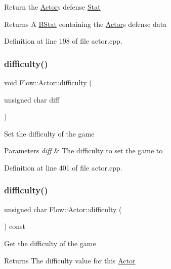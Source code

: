 Return the \hyperlink{class_flow_1_1_actor}{Actor}\textquotesingle{}s defense \hyperlink{class_flow_1_1_stat}{Stat} \begin{DoxyReturn}{Returns}
A \hyperlink{class_flow_1_1_b_stat}{B\+Stat} containing the \hyperlink{class_flow_1_1_actor}{Actor}\textquotesingle{}s defense data 
\end{DoxyReturn}


Definition at line 198 of file actor.\+cpp.

\hypertarget{class_flow_1_1_actor_aec7a9e3499e6d4441d3f32c4437b3d83}{}\label{class_flow_1_1_actor_aec7a9e3499e6d4441d3f32c4437b3d83} 
\subsubsection{\texorpdfstring{difficulty()}{difficulty()}\hspace{0.1cm}{\footnotesize\ttfamily [1/2]}}
{\footnotesize\ttfamily void Flow\+::\+Actor\+::difficulty (\begin{DoxyParamCaption}\item[{unsigned char}]{diff }\end{DoxyParamCaption})}

Set the difficulty of the game 
\begin{DoxyParams}{Parameters}
{\em diff} & The difficulty to set the game to \\
\hline
\end{DoxyParams}


Definition at line 401 of file actor.\+cpp.

\hypertarget{class_flow_1_1_actor_a2e4ed70c823b510309914f53e26495da}{}\label{class_flow_1_1_actor_a2e4ed70c823b510309914f53e26495da} 
\subsubsection{\texorpdfstring{difficulty()}{difficulty()}\hspace{0.1cm}{\footnotesize\ttfamily [2/2]}}
{\footnotesize\ttfamily unsigned char Flow\+::\+Actor\+::difficulty (\begin{DoxyParamCaption}{ }\end{DoxyParamCaption}) const}

Get the difficulty of the game \begin{DoxyReturn}{Returns}
The difficulty value for this \hyperlink{class_flow_1_1_actor}{Actor} 
\end{DoxyReturn}


